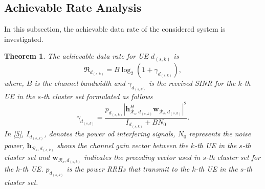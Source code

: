 \documentclass[conference,10pt,twocolumn,letter]{IEEEtran}
\newtheorem{theorem}{Theorem}
\begin{document}
\subsection{Achievable Rate Analysis}
In this subsection, the achievable data rate of the considered system is investigated. 
\begin{theorem}\label{t1}
The achievable data rate for UE $d_{(s,k)}$ is
\begin{equation}\label{e1}
\mathfrak{R}_{d_{(s,k)}} = B \log_2(1+\gamma_{d_{(s,k)}}),
\end{equation}
where, $B$ is the channel bandwidth and $\gamma_{d_{(s,k)}}$ is the received SINR for the $k$-th UE in the $s$-th cluster set formulated as follows
\begin{equation}\label{5}
\gamma_{d_{(s,k)}}= \frac{p_{d_{(s,k)}}|\boldsymbol{h}_{\mathcal{R}_s, d_{(s,k)}}^H \boldsymbol{w}_{\mathcal{R}_{s},d_{(s,k)}}|^2}{I_{d_{(s,k)}}+BN_0}.
\end{equation}
In \eqref{5}, $I_{d_{(s,k)}}$, denotes the power od interfering signals, $N_0$ represents the noise power, $\boldsymbol{h}_{\mathcal{R}_s, d_{(s,k)}}$ shows the channel gain vector between the $k$-th UE in the $s$-th cluster set and $\boldsymbol{w}_{\mathcal{R}_{s},d_{(s,k)}}$ indicates the precoding vector used in $s$-th cluster set for the $k$-th UE.
$p_{d_{(s,k)}}$ is the power RRHs that transmit to the $k$-th UE in the $s$-th cluster set.
\end{theorem}
\end{document}
